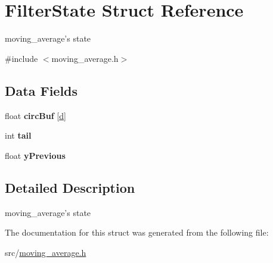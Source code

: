 \hypertarget{struct_filter_state}{\section{Filter\-State Struct Reference}
\label{struct_filter_state}
}


moving\-\_\-average's state  




{\ttfamily \#include $<$moving\-\_\-average.\-h$>$}

\subsection*{Data Fields}
\begin{DoxyCompactItemize}
\item 
\hypertarget{struct_filter_state_a639b223caecd442ba6acb888a03a4c74}{float {\bfseries circ\-Buf} \mbox{[}\hyperlink{moving__average_8h_a2530554172d8629149ec56816eeaa947}{d}\mbox{]}}\label{struct_filter_state_a639b223caecd442ba6acb888a03a4c74}

\item 
\hypertarget{struct_filter_state_aff39d864a6594bc5f4a5e365282e00fe}{int {\bfseries tail}}\label{struct_filter_state_aff39d864a6594bc5f4a5e365282e00fe}

\item 
\hypertarget{struct_filter_state_a851aa1947ee73694ecb2bda42295ab9a}{float {\bfseries y\-Previous}}\label{struct_filter_state_a851aa1947ee73694ecb2bda42295ab9a}

\end{DoxyCompactItemize}


\subsection{Detailed Description}
moving\-\_\-average's state 

The documentation for this struct was generated from the following file\-:\begin{DoxyCompactItemize}
\item 
src/\hyperlink{moving__average_8h}{moving\-\_\-average.\-h}\end{DoxyCompactItemize}
